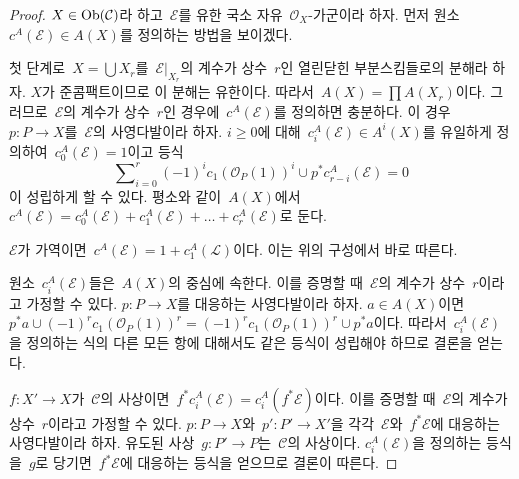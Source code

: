 \begin{proof}
$X \in \mathop{\mathrm{Ob}}\nolimits(\mathcal{C})$라 하고\  $\mathcal{E}$를 유한 국소 자유\ 
$\mathcal{O}_X$-가군이라 하자. 먼저 원소\ 
$c^A(\mathcal{E}) \in A(X)$를 정의하는 방법을 보이겠다.

\medskip\noindent
첫 단계로\  $X = \bigcup X_r$를\  $\mathcal{E}|_{X_r}$의 계수가 상수\ 
$r$인 열린닫힌 부분스킴들로의 분해라 하자. $X$가 준콤팩트이므로 이
분해는 유한이다. 따라서\  $A(X) = \prod A(X_r)$이다. 그러므로\ 
$\mathcal{E}$의 계수가 상수\  $r$인 경우에\  $c^A(\mathcal{E})$를
정의하면 충분하다. 이 경우\  $p : P \to X$를\  $\mathcal{E}$의
사영다발이라 하자. $i \geq 0$에 대해\ 
$c_i^A(\mathcal{E}) \in A^i(X)$를 유일하게 정의하여\ 
$c_0^A(\mathcal{E}) = 1$이고 등식
\begin{equation}
\label{equation-chern-classes}
\sum\nolimits_{i = 0}^r
(-1)^i c_1(\mathcal{O}_P(1))^i \cup p^*c^A_{r - i}(\mathcal{E})
= 0
\end{equation}
이 성립하게 할 수 있다. 평소와 같이\  $A(X)$에서\ 
$c^A(\mathcal{E}) = c_0^A(\mathcal{E}) + c_1^A(\mathcal{E}) + \ldots
+ c_r^A(\mathcal{E})$로 둔다.

\medskip\noindent
$\mathcal{E}$가 가역이면\ 
$c^A(\mathcal{E}) = 1 + c_1^A(\mathcal{L})$이다. 이는 위의
구성에서 바로 따른다.

\medskip\noindent
원소\  $c_i^A(\mathcal{E})$들은\  $A(X)$의 중심에 속한다. 이를
증명할 때\  $\mathcal{E}$의 계수가 상수\  $r$이라고 가정할 수 있다.
$p : P \to X$를 대응하는 사영다발이라 하자. $a \in A(X)$이면\ 
$p^*a \cup (-1)^r c_1(\mathcal{O}_P(1))^r =
(-1)^r c_1(\mathcal{O}_P(1))^r \cup p^*a$이다. 따라서\ 
$c_i^A(\mathcal{E})$을 정의하는 식의 다른 모든 항에 대해서도 같은
등식이 성립해야 하므로 결론을 얻는다.

\medskip\noindent
$f : X' \to X$가\  $\mathcal{C}$의 사상이면\ 
$f^*c_i^A(\mathcal{E}) = c_i^A(f^*\mathcal{E})$이다. 이를
증명할 때\  $\mathcal{E}$의 계수가 상수\  $r$이라고 가정할 수 있다.
$p : P \to X$와\  $p' : P' \to X'$을 각각\  $\mathcal{E}$와\ 
$f^*\mathcal{E}$에 대응하는 사영다발이라 하자. 유도된 사상\ 
$g : P' \to P$는\  $\mathcal{C}$의 사상이다.
$c_i^A(\mathcal{E})$을 정의하는 등식을\  $g$로 당기면\ 
$f^*\mathcal{E}$에 대응하는 등식을 얻으므로 결론이 따른다.


\end{proof}

